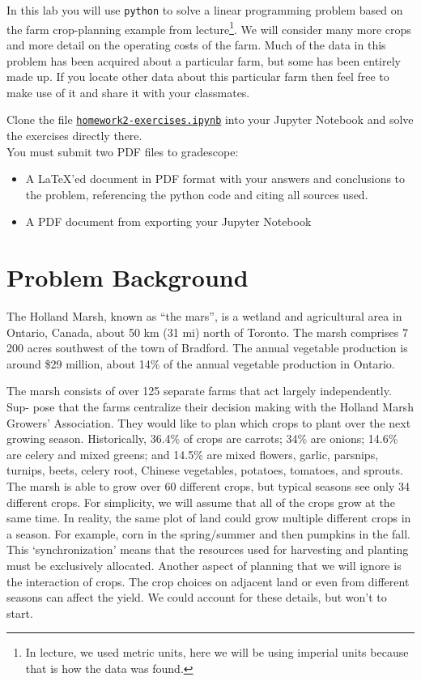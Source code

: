 \documentclass[letter]{article}
\newcommand{\setheader}[6]{
	\lhead{{\sc #1}\\{\sc #2}}%
	\rhead{
		{\bf #3} 
		\ifthenelse{\equal{#4}{}}{}{(#4)}\\
		{\bf #5} 
		\ifthenelse{\equal{#6}{}}{}{(#6)}%
	}
}
\begin{document}
	\setheader{APM348}{Homework 2}{Due: 5:59pm February 9}{}{}{}


In this lab you will use \texttt{python} to solve a linear programming problem based on the farm crop-planning example from lecture\footnote{In lecture, we used metric units, here we will be using imperial units because that is how the data was found.}. We will consider many more crops and more detail on the operating costs of the farm. Much of the data in this problem has been acquired about a particular farm, but some has been entirely made up. If you locate other data about this particular farm then feel free to make use of it and share it with your classmates.


Clone the file \href{https://utoronto.syzygy.ca/jupyter/user-redirect/git-pull?repo=https://github.com/bigfatbernie/IBLMathModeling&subPath=homeworks/homework2/homework2-exercises.ipynb}{\tt homework2-exercises.ipynb} into your Jupyter Notebook and solve the exercises directly there. \\

You must submit two PDF files to gradescope:
\begin{itemize}
	\item A \LaTeX'ed document in PDF format with your answers and conclusions to the problem, referencing the python code and citing all sources used.
	\item A PDF document from exporting your Jupyter Notebook
\end{itemize}



\section{Problem Background}

The Holland Marsh, known as ``the mars'', is a wetland and agricultural area in Ontario, Canada, about 50 km (31 mi) north of Toronto. The marsh comprises 7\,200 acres southwest of the town of Bradford. The annual vegetable production is around \$29 million, about 14\% of the annual vegetable production in Ontario.

The marsh consists of over 125 separate farms that act largely independently. Sup- pose that the farms centralize their decision making with the Holland Marsh Growers' Association. They would like to plan which crops to plant over the next growing season.
Historically, 36.4\% of crops are carrots; 34\% are onions; 14.6\% are celery and mixed greens; and 14.5\% are mixed flowers, garlic, parsnips, turnips, beets, celery root, Chinese vegetables, potatoes, tomatoes, and sprouts. The marsh is able to grow over 60 different crops, but typical seasons see only 34 different crops.
For simplicity, we will assume that all of the crops grow at the same time. In reality, the same plot of land could grow multiple different crops in a season. For example, corn in the spring/summer and then pumpkins in the fall. This `synchronization' means that the resources used for harvesting and planting must be exclusively allocated. Another aspect of planning that we will ignore is the interaction of crops. The crop choices on adjacent land or even from different seasons can affect the yield. We could account for these details, but won't to start.
\end{document}
